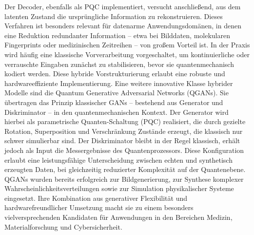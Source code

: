 Der Decoder, ebenfalls als PQC implementiert, versucht anschließend, aus dem latenten Zustand die ursprüngliche Information zu rekonstruieren. Dieses Verfahren ist besonders relevant für datenarme Anwendungsdomänen, in denen eine Reduktion redundanter Information – etwa bei Bilddaten, molekularen Fingerprints oder medizinischen Zeitreihen – von großem Vorteil ist.
In der Praxis wird häufig eine klassische Vorverarbeitung vorgeschaltet, um kontinuierliche oder verrauschte Eingaben zunächst zu stabilisieren, bevor sie quantenmechanisch kodiert werden. Diese hybride Vorstrukturierung erlaubt eine robuste und hardwareeffiziente Implementierung.
Eine weitere innovative Klasse hybrider Modelle sind die Quantum Generative Adversarial Networks (QGANs). Sie übertragen das Prinzip klassischer GANs – bestehend aus Generator und Diskriminator – in den quantenmechanischen Kontext. Der Generator wird hierbei als parametrische Quanten-Schaltung (PQC) realisiert, die durch gezielte Rotation, Superposition und Verschränkung Zustände erzeugt, die klassisch nur schwer simulierbar sind.
Der Diskriminator bleibt in der Regel klassisch, erhält jedoch als Input die Messergebnisse des Quantenprozessors. Diese Konfiguration erlaubt eine leistungsfähige Unterscheidung zwischen echten und synthetisch erzeugten Daten, bei gleichzeitig reduzierter Komplexität auf der Quantenebene.
QGANs wurden bereits erfolgreich zur Bildgenerierung, zur Synthese komplexer Wahrscheinlichkeitsverteilungen sowie zur Simulation physikalischer Systeme eingesetzt. Ihre Kombination aus generativer Flexibilität und hardwarefreundlicher Umsetzung macht sie zu einem besonders vielversprechenden Kandidaten für Anwendungen in den Bereichen Medizin, Materialforschung und Cybersicherheit. \cite{peral-garciaSystematicLiteratureReview2024}

